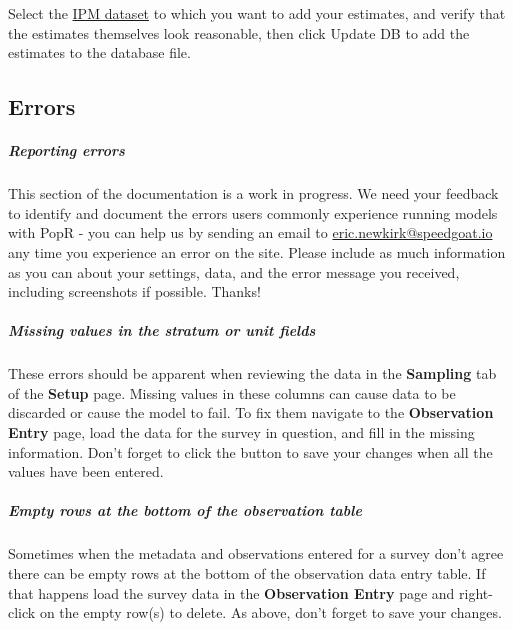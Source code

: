 \documentclass[
]{book}
\begin{document}
Select the \protect\hyperlink{gl-ipm-db}{IPM dataset} to which you want to add your estimates, and verify that the estimates themselves look reasonable, then click {Update DB} to add the estimates to the database file.

\hypertarget{sight-errors}{%
\subsection{Errors}\label{sight-errors}}

\hypertarget{reporting-errors}{%
\subparagraph*{Reporting errors}\label{reporting-errors}}

This section of the documentation is a work in progress. We need your feedback to identify and document the errors users commonly experience running models with PopR - you can help us by sending an email to \href{mailto:eric.newkirk@speedgoat.io?cc=josh.nowak@speedgoat.io\&subject=PopR\%20Error}{eric.newkirk@speedgoat.io} any time you experience an error on the site. Please include as much information as you can about your settings, data, and the error message you received, including screenshots if possible. Thanks!

\hypertarget{missing-values-in-the-stratum-or-unit-fields}{%
\subparagraph*{Missing values in the stratum or unit fields}\label{missing-values-in-the-stratum-or-unit-fields}}

These errors should be apparent when reviewing the data in the \textbf{Sampling} tab of the \textbf{Setup} page. Missing values in these columns can cause data to be discarded or cause the model to fail. To fix them navigate to the \textbf{Observation Entry} page, load the data for the survey in question, and fill in the missing information. Don't forget to click the button to save your changes when all the values have been entered.

\hypertarget{empty-rows-at-the-bottom-of-the-observation-table}{%
\subparagraph*{Empty rows at the bottom of the observation table}\label{empty-rows-at-the-bottom-of-the-observation-table}}

Sometimes when the metadata and observations entered for a survey don't agree there can be empty rows at the bottom of the observation data entry table. If that happens load the survey data in the \textbf{Observation Entry} page and right-click on the empty row(s) to delete. As above, don't forget to save your changes.
\end{document}
